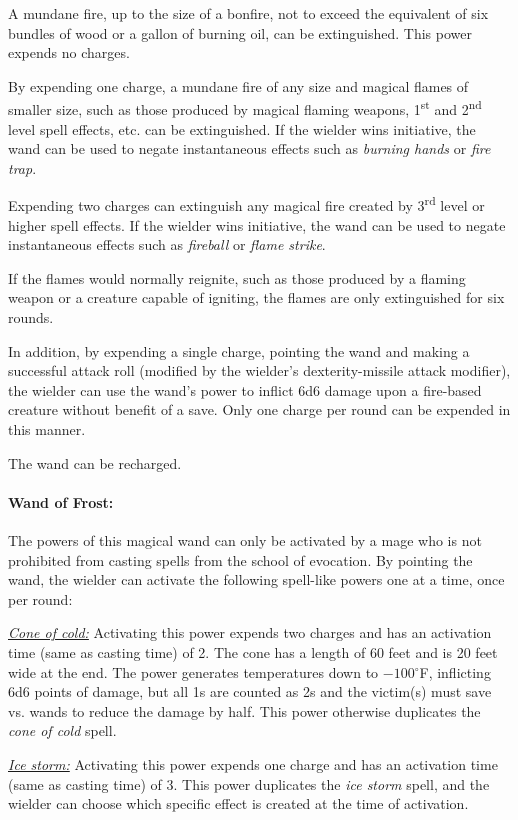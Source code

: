 \begin{multicols}{2}
A mundane fire, up to the size of a bonfire, not to exceed the equivalent of six bundles of wood or a gallon of burning oil, can be extinguished.  This power expends no charges.  

By expending one charge, a mundane fire of any size and magical flames of smaller size, such as those produced by magical flaming weapons, 1\textsuperscript{st} and 2\textsuperscript{nd} level spell effects, etc. can be extinguished.  If the wielder wins initiative, the wand can be used to negate instantaneous effects such as \textit{burning hands} or \textit{fire trap}.

Expending two charges can extinguish any magical fire created by 3\textsuperscript{rd} level or higher spell effects.  If the wielder wins initiative, the wand can be used to negate instantaneous effects such as \textit{fireball} or \textit{flame strike}.  

If the flames would normally reignite, such as those produced by a flaming weapon or a creature capable of igniting, the flames are only extinguished for six rounds.

In addition, by expending a single charge, pointing the wand and making a successful attack roll (modified by the wielder's dexterity-missile attack modifier), the wielder can use the wand's power to inflict 6d6 damage upon a fire-based creature without benefit of a save.  Only one charge per round can be expended in this manner.

The wand can be recharged.

\paragraph{Wand of Frost:} The powers of this magical wand can only be activated by a mage who is not prohibited from casting spells from the school of evocation.  By pointing the wand, the wielder can activate the following spell-like powers one at a time, once per round:  

\underline{\textit{Cone of cold:}} Activating this power expends two charges and has an activation time (same as casting time) of 2.  The cone has a length of 60 feet and is 20 feet wide at the end.  The power generates temperatures down to $-100$$^\circ$F, inflicting 6d6 points of damage, but all 1s are counted as 2s and the victim(s) must save vs. wands to reduce the damage by half.  This power otherwise duplicates the \textit{cone of cold} spell. 

\underline{\textit{Ice storm:}} Activating this power expends one charge and has an activation time (same as casting time) of 3.  This power duplicates the \textit{ice storm} spell, and the wielder can choose which specific effect is created at the time of activation.


\end{multicols}
